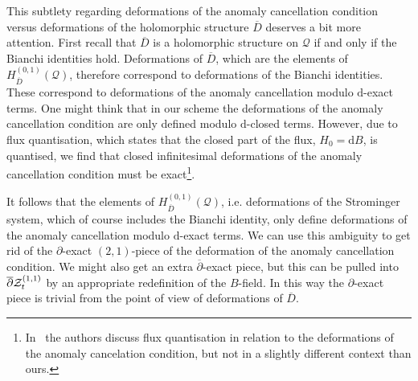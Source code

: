 \documentclass[12pt,a4paper]{article}
\def\bar#1{\overline{#1}}
\let\p=\partial
\def\d{\textrm{d}}
\def\bp{\bar{\partial}}
\def\Q{\mathcal{Q}}
\theoremstyle{definition}
\begin{document}
This subtlety regarding deformations of the anomaly cancellation condition versus deformations of the holomorphic structure $\bar D$ deserves a bit more attention. First recall that $\bar D$ is a holomorphic structure on $\Q$ if and only if the Bianchi identities hold. Deformations of $\bar D$, which are the elements of $H^{(0,1)}_{\bar D}(\Q)$, therefore correspond to deformations of the Bianchi identities.  These correspond to deformations of the anomaly cancellation modulo $\d$-exact terms. One might think that in our scheme the deformations of the anomaly cancellation condition are only defined modulo $\d$-closed terms. However, due to flux quantisation, which states that the closed part of the flux, $H_0=\d B$, is quantised, we find that closed infinitesimal deformations of the anomaly cancellation condition must be exact\footnote{In~\citep{Anderson:2014xha} the authors discuss flux quantisation in relation to the deformations of the anomaly cancelation condition, but not in a slightly different context than ours.}.

It follows that the elements of $H^{(0,1)}_{\bar D}(\Q)$, i.e. deformations of the Strominger system, which of course includes the Bianchi identity, only define deformations of the anomaly cancellation modulo $\d$-exact terms. We can use this ambiguity to get rid of the $\p$-exact $(2,1)$-piece of the deformation of the anomaly cancellation condition. We might also get an extra $\bp$-exact piece, but this can be pulled into $\bp{\cal Z}_t^{(1,1)}$ by an appropriate redefinition of the $B$-field. In this way the $\p$-exact piece is trivial from the point of view of deformations of $\bar D$.
\end{document}
